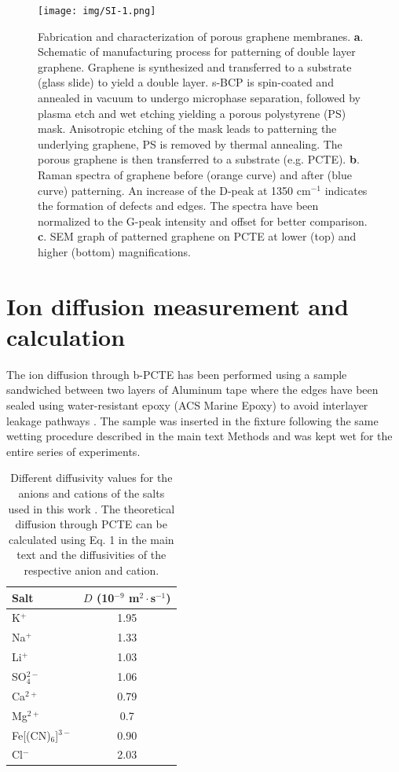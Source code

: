 \documentclass[journal=langd5,email=true, hyperref=true, keywords=false]{achemso}
\begin{document}
\begin{figure}[htbp]
  \centering
  \texttt{[image: img/SI-1.png]}
  \caption{Fabrication and characterization of porous graphene membranes. \textbf{a}. Schematic of manufacturing process for
    patterning of double layer graphene. Graphene is synthesized and
    transferred to a substrate (glass slide) to yield a double
    layer. s-BCP is spin-coated and annealed in vacuum to undergo microphase
    separation, followed by plasma etch and wet etching yielding a
    porous polystyrene (PS) mask. Anisotropic etching of the mask
    leads to patterning the underlying graphene, PS is removed by
    thermal annealing. The porous graphene is then transferred to a
    substrate (e.g. PCTE). \textbf{b}. Raman spectra of graphene
    before (orange curve) and after (blue
    curve) patterning. An increase of the D-peak at 1350 cm$^{-1}$ indicates the
    formation of defects and edges. The spectra have been normalized
    to the G-peak intensity and offset for better
    comparison. \textbf{c}. SEM graph of patterned graphene on PCTE at
    lower (top) and higher (bottom) magnifications.
  }
  \label{fig:exp}
\end{figure}

\section{Ion diffusion measurement and calculation}
\label{sec:measure}

The ion diffusion through b-PCTE has been performed using a sample
sandwiched between two layers of Aluminum tape where the edges have
been sealed using water-resistant epoxy (ACS Marine Epoxy) to avoid
interlayer leakage pathways \cite{Choi_2018}.  The sample was inserted in
the fixture following the same wetting procedure described in the main
text Methods and was kept wet for the entire series of experiments.

\begin{table}[htbp]
  \centering
  \begin{tabular}{lc}
    \hline
    Salt & $D$ (10$^{-9}$ m$^{2}\cdot$s$^{-1}$) \\
    \hline
    K$^{+}$     & 1.95 \\
    Na$^{+}$    & 1.33 \\
    Li$^{+}$    & 1.03 \\
    SO$_{4}^{2-}$       & 1.06 \\
    Ca$^{2+}$   & 0.79\\
    Mg$^{2+}$ & 0.7\\
    Fe{[(CN)$_{6}$]}$^{3-}$   & 0.90\\
    Cl$^{-}$ &  2.03 \\
               \hline
  \end{tabular}
  \caption{Different diffusivity values for the anions and cations of the
    salts used in this work \cite{vanysek_2000}. The theoretical
    diffusion through PCTE can be calculated using Eq. 1 in the main
    text and the diffusivities of the respective anion and cation.}
  \label{tab:diff}
\end{table}
\end{document}

